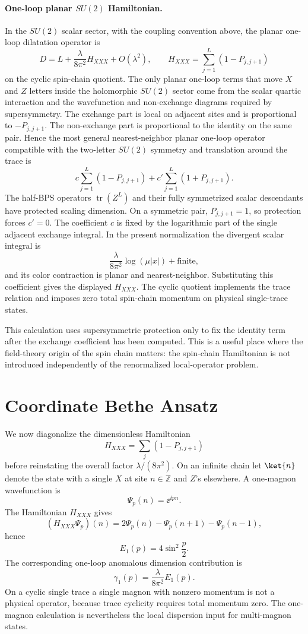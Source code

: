 \paragraph{One-loop planar \(SU(2)\) Hamiltonian.}
In the \(SU(2)\) scalar sector, with the coupling convention above, the planar
one-loop dilatation operator is
\[
  D
  =
  L+\frac{\lambda}{8\pi^2}H_{XXX}
  +O(\lambda^2),
  \qquad
  H_{XXX}=\sum_{j=1}^{L}(1-P_{j,j+1})
\]
on the cyclic spin-chain quotient.
The only planar one-loop terms that move \(X\) and \(Z\) letters inside the
holomorphic \(SU(2)\) sector come from the scalar quartic interaction and the
wavefunction and non-exchange diagrams required by supersymmetry.  The
exchange part is local on adjacent sites and is proportional to
\(-P_{j,j+1}\).  The non-exchange part is proportional to the identity on the
same pair.  Hence the most general nearest-neighbor planar one-loop operator
compatible with the two-letter \(SU(2)\) symmetry and translation around the
trace is
\[
  c\sum_{j=1}^L(1-P_{j,j+1})+c'\sum_{j=1}^L(1+P_{j,j+1}).
\]
The half-BPS operators \(\operatorname{tr}(Z^L)\) and their fully symmetrized
scalar descendants have protected scaling dimension.  On a symmetric pair,
\(P_{j,j+1}=1\), so protection forces \(c'=0\).  The coefficient \(c\) is
fixed by the logarithmic part of the single adjacent exchange integral.  In
the present normalization the divergent scalar integral is
\[
  \frac{\lambda}{8\pi^2}\log(\mu |x|)+\text{finite},
\]
and its color contraction is planar and nearest-neighbor.  Substituting this
coefficient gives the displayed \(H_{XXX}\).  The cyclic quotient implements
the trace relation and imposes zero total spin-chain momentum on physical
single-trace states.

This calculation uses supersymmetric protection only to fix the identity term
after the exchange coefficient has been computed.  This is a useful place where
the field-theory origin of the spin chain matters: the spin-chain Hamiltonian is
not introduced independently of the renormalized local-operator problem.

\section{Coordinate Bethe Ansatz}

We now diagonalize the dimensionless Hamiltonian
\[
  H_{XXX}=\sum_{j}(1-P_{j,j+1})
\]
before reinstating the overall factor \(\lambda/(8\pi^2)\).  On an infinite
chain let \(\ket{n}\) denote the state with a single \(X\) at site
\(n\in\mathbb Z\) and \(Z\)'s elsewhere.  A one-magnon wavefunction is
\[
  \Psi_p(n)=\ee^{\ii pn}.
\]
The Hamiltonian \(H_{XXX}\) gives
\[
  (H_{XXX}\Psi_p)(n)
  =
  2\Psi_p(n)-\Psi_p(n+1)-\Psi_p(n-1),
\]
hence
\[
  E_1(p)=4\sin^2\frac p2 .
\]
The corresponding one-loop anomalous dimension contribution is
\[
  \gamma_1(p)=\frac{\lambda}{8\pi^2}E_1(p).
\]
On a cyclic single trace a single magnon with nonzero momentum is not a
physical operator, because trace cyclicity requires total momentum zero.  The
one-magnon calculation is nevertheless the local dispersion input for
multi-magnon states.

